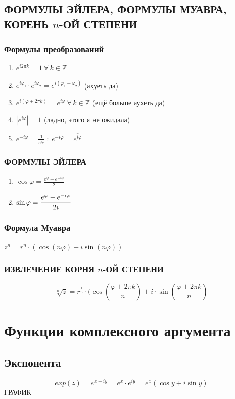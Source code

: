 \documentclass{article}
\newcommand{\Z}{\mathbb Z}
\begin{document}
\subsection{ФОРМУЛЫ ЭЙЛЕРА, ФОРМУЛЫ МУАВРА, КОРЕНЬ $n$-ОЙ СТЕПЕНИ}
\subsubsection{Формулы преобразований}
\begin{enumerate}
    \item $e^{i2\pi k}=1\:\forall\,k\in\Z$
    \item $e^{i\varphi_1}\cdot e^{i\varphi_2}=e^{i(\varphi_1+\varphi_2)}$ (ахуеть да)
    \item $e^{i(\varphi+2\pi k)}=e^{i\varphi}\:\forall\,k\in\Z$ (ещё больше аухеть да)
    \item $|e^{i\varphi}|=1$ (ладно, этого я не ожидала)
    \item $e^{-i\varphi}=\frac{1}{e^{i\varphi}}\::\:e^{-i\varphi}=\overline{e^{i\varphi}}$
\end{enumerate}
\subsubsection{ФОРМУЛЫ ЭЙЛЕРА}
    \begin{enumerate}
        \item $\cos\varphi=\frac{e^{\varphi}+e^{-i\varphi}}{2}$
        \item $\sin\varphi=\cfrac{e^{\varphi}-e^{-i\varphi}}{2i}$
    \end{enumerate}
\subsubsection{Формула Муавра}
    
    $z^n=r^n\cdot(\cos(n\varphi)+i\sin(n\varphi))$
    
\subsubsection{ИЗВЛЕЧЕНИЕ КОРНЯ $n$-ОЙ СТЕПЕНИ}
    
    $$\sqrt[n]{z}=r^{\frac{1}{n}}\cdot(\cos(\frac{\varphi+2\pi k}{n})+i\cdot \sin(\frac{\varphi+2\pi k}{n})$$

\newpage
\section{Функции комплексного аргумента}
\subsection{Экспонента}
$$ exp(z)=e^{x+iy}=e^x\cdot e^{iy}=e^x(\cos y+i\sin y) $$
ГРАФИК
\end{document}

